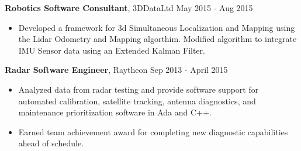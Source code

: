 \documentclass{article} %
\newcommand{\rjob}[2]{
  \hspace*{-0.3cm}
{\fontsize{10pt}{12pt}\selectfont #1} \hfill #2
\vspace*{0.1cm}
\hspace*{-1.2cm}
}
\newenvironment{ritemize}{
\hspace*{-0.8cm}
\begin{minipage}{1.05\linewidth}
\begin{itemize}
}{
\end{itemize}
\end{minipage}
}
\newcommand{\ritem}{
\item[-]
}
\begin{document}
\rjob{\textbf{Robotics Software Consultant}, 3DDataLtd}{May 2015 - Aug 2015}\\
\begin{ritemize}
\ritem Developed a framework for 3d Simultaneous Localization and Mapping using the Lidar Odometry and Mapping algorthim. Modified algorithm to integrate IMU Sensor data using an Extended Kalman Filter.
\end{ritemize}

\rjob{\textbf{Radar Software Engineer}, Raytheon}{Sep 2013 - April 2015}\\
\begin{ritemize}
\ritem Analyzed data from radar testing and provide software support for automated calibration, satellite tracking, antenna diagnostics, and maintenance prioritization software in Ada and C++.
\ritem Earned team achievement award for completing new diagnostic capabilities ahead of schedule.
\end{ritemize}








\end{document}
